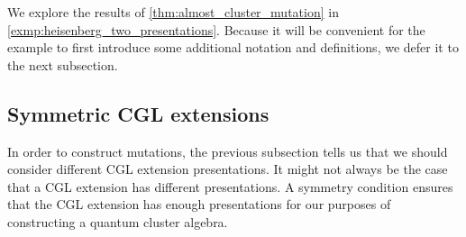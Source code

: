 We explore the results of \cref{thm:almost_cluster_mutation} in
\cref{exmp:heisenberg_two_presentations}. Because it will be convenient for the example
to first introduce some additional notation and definitions, we defer it to the next
subsection.

\subsection{Symmetric CGL extensions}

In order to construct mutations, the previous subsection tells us that we should
consider different CGL extension presentations. It might not always be the case that a
CGL extension has different presentations. A symmetry condition ensures that the CGL
extension has enough presentations for our purposes of constructing a quantum cluster
algebra.

